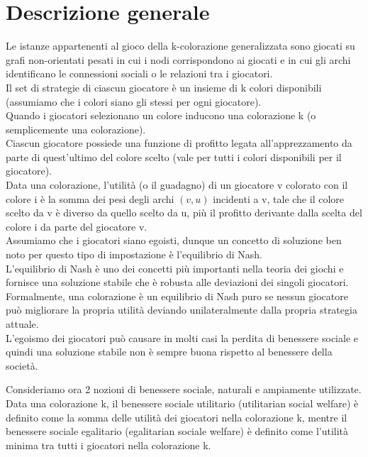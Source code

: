 \section{Descrizione generale}
\justify
Le istanze appartenenti al gioco della k-colorazione generalizzata sono giocati su grafi non-orientati pesati in cui i nodi corrispondono ai giocati e in cui gli archi identificano le connessioni sociali o le relazioni tra i giocatori.\\
Il set di strategie di ciascun giocatore è un insieme di k colori disponibili (assumiamo che i colori siano gli stessi per ogni giocatore).\\
Quando i giocatori selezionano un colore inducono una colorazione k (o semplicemente una colorazione).\\
Ciascun giocatore possiede una funzione di profitto legata all'apprezzamento da parte di quest'ultimo del colore scelto (vale per tutti i colori disponibili per il giocatore).\\
Data una colorazione, l'utilità (o il guadagno) di un giocatore v colorato con il colore i è la somma dei pesi degli archi \((v, u)\) incidenti a v, tale che il colore scelto da v è diverso da quello scelto da u, più il profitto derivante dalla scelta del colore i da parte del giocatore v.\\
Assumiamo che i giocatori siano egoisti, dunque un concetto di soluzione ben noto per questo tipo di impostazione è l'equilibrio di Nash.\\
L'equilibrio di Nash è uno dei concetti più importanti nella teoria dei giochi e fornisce una soluzione stabile che è robusta alle deviazioni dei singoli giocatori.\\
Formalmente, una colorazione è un equilibrio di Nash puro se nessun giocatore può migliorare la propria utilità deviando unilateralmente dalla propria strategia attuale.\\
L'egoismo dei giocatori può causare in molti casi la perdita di benessere sociale e quindi una soluzione stabile non è sempre buona rispetto al benessere della società.\newline

Consideriamo ora 2 nozioni di benessere sociale, naturali e ampiamente utilizzate.\\
Data una colorazione k, il benessere sociale utilitario (utilitarian social welfare) è definito come la somma delle utilità dei giocatori nella colorazione k, mentre il benessere sociale egalitario (egalitarian sociale welfare) è definito come l'utilità minima tra tutti i giocatori nella colorazione k.\newline

